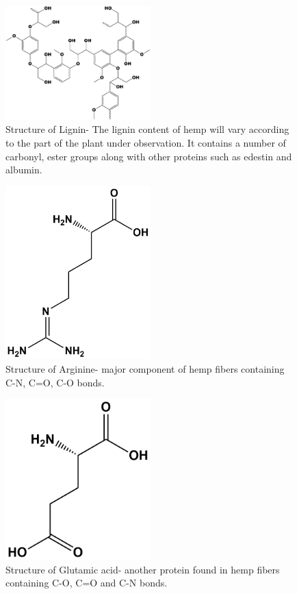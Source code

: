 \begin{figure}[tbh!]
  \centering
  \includegraphics[width=0.5\textwidth]{SF/lignin}
    \caption{Structure of Lignin- The lignin content of hemp will vary according to the part of the plant under observation. It contains a number of carbonyl, ester groups along with other proteins such as edestin and albumin.}
  \label{SF:lignin}
\end{figure}
\begin{figure}[tbh!]
  \centering
  \includegraphics[width=0.5\textwidth]{SF/arginine}    \caption{Structure of Arginine- major component of hemp fibers containing C-N, C=O, C-O bonds.}
  \label{SF:arginine}
\end{figure}
\begin{figure}[tbh!]
  \centering
  \includegraphics[width=0.5\textwidth]{SF/glutamicacid}
    \caption{Structure of Glutamic acid- another protein found in hemp fibers containing C-O, C=O and C-N bonds.}
  \label{SF:glutamicacid}
\end{figure}
